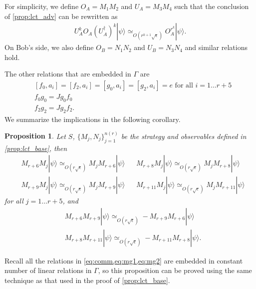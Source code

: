 \documentclass[11pt,letterpaper]{article}
\newcommand{\ket}[1]{|#1\rangle}
\newcommand{\ct}{^{\dagger}}
\newcommand{\1}{\mathbb{1}}
\newcommand{\nr}{n(r)}
\newcommand{\se}{\sqrt{\epsilon}}
\newcommand{\appd}[1]{\simeq_{#1}}
\newtheorem{proposition}[theorem]{Proposition}
\theoremstyle{definition}
\begin{document}
For simplicity, we define $O_A = M_1M_2$ and $U_A=M_3M_4$ such that
the conclusion of \cref{prop:lct_adv} can be rewritten as 
\begin{align}
	U_A^k O_A (U_A\ct)^k \ket{\psi} \appd{O(r^{k+1} \se)} O_A^{r^k} \ket{\psi}.
\end{align}
On Bob's side, we also define $O_B = N_1N_2$ and $U_B = N_3N_4$ 
and similar relations hold.

The other relations that are embedded in $\Gamma$ are 
\begin{align}
	\label{eq:comm}&[f_0, a_i] = [f_2, a_i] = [g_0, a_i] = [g_2, a_i] = e \text{ for all } i = 1 \dots r+5 \\
	\label{eq:mg1}&f_0g_0 = Jg_0f_0 \\
	\label{eq:mg2}&f_2g_2 = J g_2 f_2.
\end{align}
We summarize the implications in the following corollary.
\begin{proposition}
	\label{prop:lct_comm}
	Let $S$, $\{M_j, N_j\}_{j=1}^{\nr}$ be the strategy and observables defined in \cref{prop:lct_base},
	then
	\begin{align}
		&M_{r+6} M_j \ket{\psi} \appd{O(r\se)} M_j M_{r+6} \ket{\psi} && 
		M_{r+8}M_j \ket{\psi} \appd{O(r\se)} M_j M_{r+8} \ket{\psi} \\
		&M_{r+9} M_j \ket{\psi} \appd{O(r\se)} M_j M_{r+9} \ket{\psi} && 
		M_{r+11}M_j \ket{\psi} \appd{O(r\se)} M_j M_{r+11} \ket{\psi} 
	\end{align}
	for all $j = 1 \dots r+5$, and
	\begin{align}
		&M_{r+6}M_{r+9} \ket{\psi} \appd{O(r\se)} - M_{r+9}M_{r+6} \ket{\psi} \\
		&M_{r+8}M_{r+11} \ket{\psi} \appd{O(r\se)} -M_{r+11}M_{r+8} \ket{\psi}.
	\end{align}
\end{proposition}
Recall all the relations in \cref{eq:comm,eq:mg1,eq:mg2} are embedded in constant number of linear relations in $\Gamma$,
so this proposition can be proved using the same technique as that used in the proof of \cref{prop:lct_base}.
\end{document}
